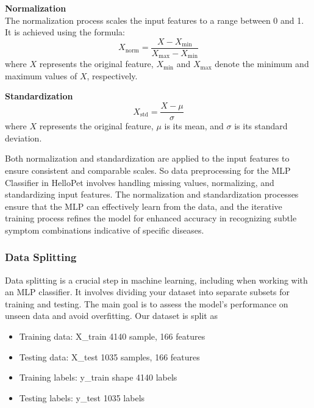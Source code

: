    \noindent\textbf{Normalization}\\
   The normalization process scales the input features to a range between 0 and 1. It is achieved using the formula:
   \begin{equation}
       X_{\text{norm}} = \frac{X - X_{\text{min}}}{X_{\text{max}} - X_{\text{min}}}
   \end{equation}
    where $X$ represents the original feature, $X_{\text{min}}$ and $X_{\text{max}}$ denote the minimum and maximum values of $X$, respectively.

    \noindent\textbf{Standardization}
    \begin{equation}
    X_{\text{std}} = \frac{X - \mu}{\sigma}     
    \end{equation}
    where $X$ represents the original feature, $\mu$ is its mean, and $\sigma$ is its standard deviation.

    \noindent Both normalization and standardization are applied to the input features to ensure consistent and comparable scales. So data preprocessing for the MLP Classifier in HelloPet involves handling missing values, normalizing, and standardizing input features. The normalization and standardization processes ensure that the MLP can effectively learn from the data, and the iterative training process refines the model for enhanced accuracy in recognizing subtle symptom combinations indicative of specific diseases.


\subsubsection{Data Splitting}
Data splitting is a crucial step in machine learning, including when working with an MLP classifier. It involves dividing your dataset into separate subsets for training and testing. The main goal is to assess the model's performance on unseen data and avoid overfitting. Our dataset is split as
\begin{itemize}
    \item Training data: X\_train 4140 sample, 166 features
    \item Testing data:  X\_test 1035 samples, 166 features
    \item Training labels: y\_train shape 4140 labels
    \item Testing labels: y\_test 1035 labels
\end{itemize}
